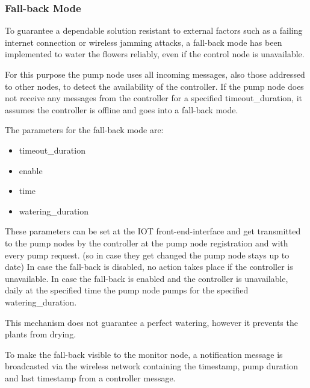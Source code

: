 \subsubsection{Fall-back Mode}
To guarantee a dependable solution resistant to external factors such as a failing internet connection or wireless jamming attacks, a fall-back mode has been implemented to water the flowers reliably, even if the control node is unavailable.

For this purpose the pump node uses all incoming messages, also those addressed to other nodes, to detect the availability of the controller. If the pump node does not receive any messages from the controller for a specified timeout\_duration, it assumes the controller is offline and goes into a fall-back mode.

The parameters for the fall-back mode are:
\begin{itemize}
\item timeout\_duration
\item enable
\item time
\item watering\_duration
\end{itemize}

These parameters can be set at the IOT front-end-interface and get transmitted to the pump nodes by the controller at the pump node registration and with every pump request. (so in case they get changed the pump node stays up to date)
In case the fall-back is disabled, no action takes place if the controller is unavailable.
In case the fall-back is enabled and the controller is unavailable, daily at the specified time the pump node pumps for the specified watering\_duration.

This mechanism does not guarantee a perfect watering, however it prevents the plants from drying.

To make the fall-back visible to the monitor node, a notification message is broadcasted via the wireless network containing the timestamp, pump duration and last timestamp from a controller message.